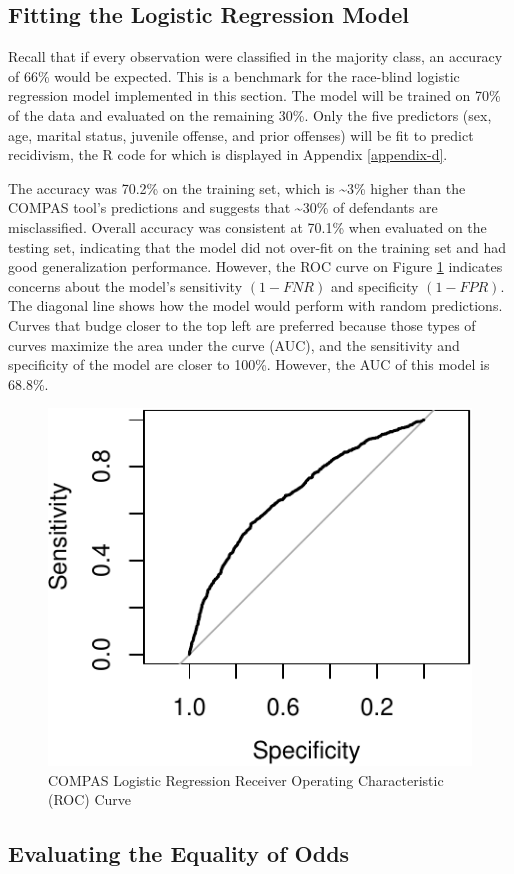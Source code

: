 \documentclass[12pt, twoside]{amherstthesis}
\begin{document}
\hypertarget{fitting-the-logistic-regression-model}{%
\subsection{Fitting the Logistic Regression Model}\label{fitting-the-logistic-regression-model}}

Recall that if every observation were classified in the majority class, an accuracy of 66\% would be expected. This is a benchmark for the race-blind logistic regression model implemented in this section. The model will be trained on 70\% of the data and evaluated on the remaining 30\%. Only the five predictors (sex, age, marital status, juvenile offense, and prior offenses) will be fit to predict recidivism, the R code for which is displayed in Appendix \ref{appendix-d}.

The accuracy was 70.2\% on the training set, which is \textasciitilde3\% higher than the COMPAS tool's predictions and suggests that \textasciitilde30\% of defendants are misclassified. Overall accuracy was consistent at 70.1\% when evaluated on the testing set, indicating that the model did not over-fit on the training set and had good generalization performance. However, the ROC curve on Figure \ref{fig:ch3fig12} indicates concerns about the model's sensitivity \((1 - FNR)\) and specificity \((1 - FPR)\). The diagonal line shows how the model would perform with random predictions. Curves that budge closer to the top left are preferred because those types of curves maximize the area under the curve (AUC), and the sensitivity and specificity of the model are closer to 100\%. However, the AUC of this model is 68.8\%.
\begin{figure}

{\centering \includegraphics{Dasha-Asienga_StatThesis_files/figure-latex/ch3fig12-1} 

}

\caption{COMPAS Logistic Regression Receiver Operating Characteristic (ROC) Curve}\label{fig:ch3fig12}
\end{figure}
\hypertarget{evaluating-the-equality-of-odds}{%
\subsection{Evaluating the Equality of Odds}\label{evaluating-the-equality-of-odds}}
\end{document}
